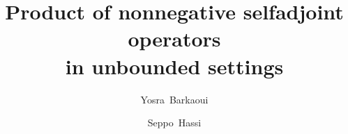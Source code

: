 \documentclass{amsart}
\numberwithin{equation}{section}
\begin{document}
\title{Product of  nonnegative selfadjoint operators \\ in unbounded settings}

%

\author{Yosra~Barkaoui}
\address{Department of Mathematics and Statistics \\
University of Vaasa \\
P.O. Box 700, 65101 Vaasa \\
Finland}

\author{Seppo~Hassi}

\address{Department of Mathematics and Statistics \\
University of Vaasa \\
P.O. Box 700, 65101 Vaasa \\
Finland}





\maketitle
\end{document}
